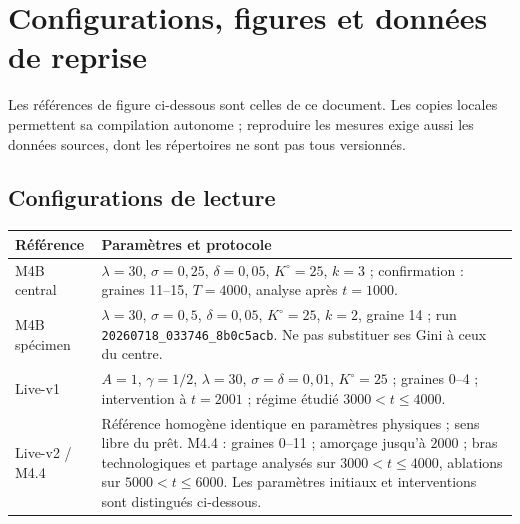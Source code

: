 \section{Configurations, figures et données de reprise}
\label{sec:sources_revision}
Les références de figure ci-dessous sont celles de ce document. Les copies
locales permettent sa compilation autonome ; reproduire les mesures exige
aussi les données sources, dont les répertoires ne sont pas tous versionnés.
\subsection{Configurations de lecture}
\begin{longtable}{@{}p{.19\linewidth}p{.75\linewidth}@{}}
\toprule Référence & Paramètres et protocole \\
\midrule\endhead
M4B central & $\lambda=30$, $\sigma=0{,}25$, $\delta=0{,}05$, $K^\circ=25$, $k=3$ ; confirmation : graines 11--15, $T=4000$, analyse après $t=1000$. \\
M4B spécimen & $\lambda=30$, $\sigma=0{,}5$, $\delta=0{,}05$, $K^\circ=25$, $k=2$, graine 14 ; run \texttt{20260718\_033746\_8b0c5acb}. Ne pas substituer ses Gini à ceux du centre. \\
Live-v1 & $A=1$, $\gamma=1/2$, $\lambda=30$, $\sigma=\delta=0{,}01$, $K^\circ=25$ ; graines 0--4 ; intervention à $t=2001$ ; régime étudié $3000<t\le4000$. \\
Live-v2 / M4.4 & Référence homogène identique en paramètres physiques ; sens libre du prêt. M4.4 : graines 0--11 ; amorçage jusqu'à $2000$ ; bras technologiques et partage analysés sur $3000<t\le4000$, ablations sur $5000<t\le6000$. Les paramètres initiaux et interventions sont distingués ci-dessous. \\
\bottomrule\end{longtable}
